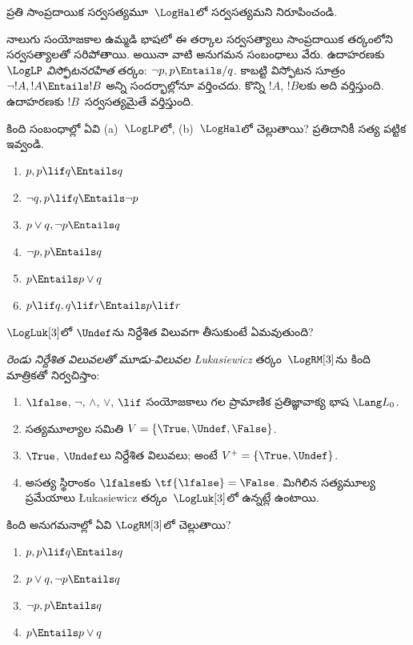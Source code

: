 \documentclass[../../../include/open-logic-section]{subfiles}
\begin{document}
\begin{prob}
ప్రతి సాంప్రదాయిక సర్వసత్యమూ~$\LogHal$లో
సర్వసత్యమని నిరూపించండి.
\end{prob}

నాలుగు సంయోజకాల ఉమ్మడి భాషలో ఈ తర్కాల
సర్వసత్యాలు సాంప్రదాయిక తర్కంలోని సర్వసత్యాలతో
సరిపోతాయి. అయినా వాటి అనుగమన సంబంధాలు వేరు.
ఉదాహరణకు $\LogLP$ \emph{విస్ఫోటనరహిత}
తర్కం: $\lnot p, p \Entails/ q$.
కాబట్టి విస్ఫోటన సూత్రం
$\lnot !A, !A \Entails !B$ అన్ని సందర్భాల్లోనూ
వర్తించదు. కొన్ని $!A$, $!B$లకు అది వర్తిస్తుంది.
ఉదాహరణకు $!B$~సర్వసత్యమైతే వర్తిస్తుంది.

\begin{prob}
  కింది సంబంధాల్లో ఏవి (a)~$\LogLP$లో,
  (b)~$\LogHal$లో చెల్లుతాయి?
  ప్రతిదానికీ సత్య పట్టిక ఇవ్వండి.
  \begin{enumerate}
    \item $p, p \lif q \Entails q$
    \item $\lnot q, p \lif q \Entails \lnot p$
    \item $p \lor q, \lnot p \Entails q$
    \item $\lnot p, p \Entails q$
    \item $p \Entails p \lor q$
    \item $p \lif q, q\lif r \Entails p \lif r$
  \end{enumerate}
\end{prob}

$\LogLuk[3]$లో $\Undef$ను నిర్దేశిత
విలువగా తీసుకుంటే ఏమవుతుంది?

\begin{defn}
  \emph{రెండు నిర్దేశిత విలువలతో మూడు-విలువల \L ukasiewicz}
  తర్కం~$\LogRM[3]$ను కింది మాత్రికతో
  నిర్వచిస్తాం:
  \begin{enumerate}
    \item $\lfalse$, $\lnot$, $\land$, $\lor$, $\lif$
    సంయోజకాలు గల ప్రామాణిక ప్రతిజ్ఞావాక్య
    భాష $\Lang L_0$.
    \item సత్యమూల్యాల సమితి $V = \{\True, \Undef, \False\}$.
    \item $\True$, $\Undef$లు నిర్దేశిత విలువలు;
    అంటే $V^+ = \{\True, \Undef\}$.
    \item అసత్య స్థిరాంకం $\lfalse$కు $\tf{\lfalse} = \False$.
    మిగిలిన సత్యమూల్య ప్రమేయాలు \L ukasiewicz తర్కం~$\LogLuk[3]$లో ఉన్నట్లే ఉంటాయి.
  \end{enumerate}
%
%
%
%
%
%
%
%
%
%
\end{defn}

\begin{prob}
  కింది అనుగమనాల్లో ఏవి $\LogRM[3]$లో చెల్లుతాయి?
  \begin{enumerate}
    \item $p, p \lif q \Entails q$
    \item $p \lor q, \lnot p \Entails q$
    \item $\lnot p, p \Entails q$
    \item $p \Entails p \lor q$
  \end{enumerate}
\end{prob}
\end{document}
